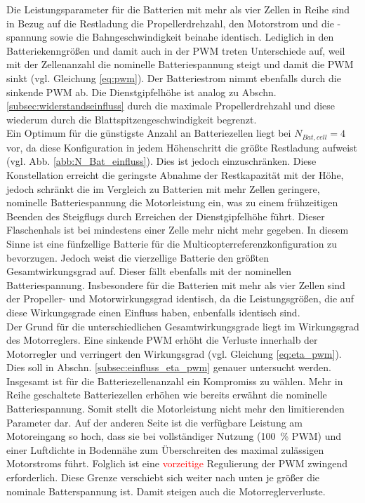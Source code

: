 Die Leistungsparameter für die Batterien mit mehr als vier Zellen in Reihe sind in Bezug auf die Restladung die Propellerdrehzahl, den Motorstrom und die -spannung sowie die Bahngeschwindigkeit beinahe identisch. Lediglich in den Batteriekenngrößen und damit auch in der PWM treten Unterschiede auf, weil mit der Zellenanzahl die nominelle Batteriespannung steigt und damit die PWM sinkt (vgl. Gleichung \ref{eq:pwm}). Der Batteriestrom nimmt ebenfalls durch die sinkende PWM ab. Die Dienstgipfelhöhe ist analog zu Abschn. \ref{subsec:widerstandseinfluss} durch die maximale Propellerdrehzahl und diese wiederum durch die Blattspitzengeschwindigkeit begrenzt. \\
Ein Optimum für die günstigste Anzahl an Batteriezellen liegt bei \ensuremath{N_{Bat,cell} = 4} vor, da diese Konfiguration in jedem Höhenschritt die größte Restladung aufweist (vgl. Abb. \ref{abb:N_Bat_einfluss}). Dies ist jedoch einzuschränken. Diese Konstellation erreicht die geringste Abnahme der Restkapazität mit der Höhe, jedoch schränkt die im Vergleich zu Batterien mit mehr Zellen geringere, nominelle Batteriespannung die Motorleistung ein, was zu einem frühzeitigen Beenden des Steigflugs durch Erreichen der Dienstgipfelhöhe führt. Dieser Flaschenhals ist bei mindestens einer Zelle mehr nicht mehr gegeben. In diesem Sinne ist eine fünfzellige Batterie für die Multicopterreferenzkonfiguration zu bevorzugen. Jedoch weist die vierzellige Batterie den größten Gesamtwirkungsgrad auf. Dieser fällt ebenfalls mit der nominellen Batteriespannung. Insbesondere für die Batterien mit mehr als vier Zellen sind der Propeller- und Motorwirkungsgrad identisch, da die Leistungsgrößen, die auf diese Wirkungsgrade einen Einfluss haben, enbenfalls identisch sind. \\
Der Grund für die unterschiedlichen Gesamtwirkungsgrade liegt im Wirkungsgrad des Motorreglers. Eine sinkende PWM erhöht die Verluste innerhalb der Motorregler und verringert den Wirkungsgrad (vgl. Gleichung \ref{eq:eta_pwm}). Dies soll in Abschn. \ref{subsec:einfluss_eta_pwm} genauer untersucht werden.\\
Insgesamt ist für die Batteriezellenanzahl ein Kompromiss zu wählen. 
Mehr in Reihe geschaltete Batteriezellen erhöhen wie bereits erwähnt die nominelle Batteriespannung. Somit stellt die Motorleistung nicht mehr den limitierenden Parameter dar. Auf der anderen Seite ist die verfügbare Leistung am Motoreingang so hoch, dass sie bei vollständiger Nutzung (\SI{100}{\%} PWM) und einer Luftdichte in Bodennähe zum Überschreiten des maximal zulässigen Motorstroms führt. Folglich ist eine \textcolor{red}{vorzeitige} Regulierung der PWM zwingend erforderlich. Diese Grenze verschiebt sich weiter nach unten je größer die nominale Batterspannung ist. Damit steigen auch die Motorreglerverluste.


